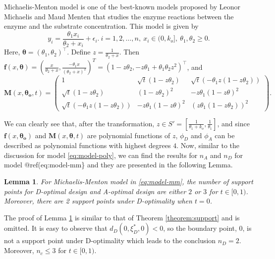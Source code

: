 \documentclass[
]{book}
\newtheorem{lemma}{Lemma}[chapter]
\theoremstyle{definition}
\theoremstyle{definition}
\theoremstyle{definition}
\theoremstyle{definition}
\theoremstyle{remark}
\begin{document}
Michaelis-Menton model is one of the best-known models proposed by Leonor Michaelis and Maud Menten \citep{mm1913kinetik} that studies the enzyme reactions between the enzyme and the substrate concentration. This model is given by
\begin{equation}
y_i=\frac{\theta_1x_i}{\theta_2+x_i}+\epsilon_i.~ i=1,2,\dots,n,~ x_i \in(0,                                                                k_o],~\theta_1,\theta_2\geq 0.
\label{eq:model-mm}
\end{equation}
Here, \(\boldsymbol{\theta}=(\theta_1,\theta_2)^\top\). Define \(z=\frac{1}{\theta_2+x}\). Then \(\boldsymbol{f}(x,\boldsymbol{\theta})=(\frac{x}{\theta_2+x},\frac{-\theta_1x}{(\theta_2+x)^2})^T= (1-z\theta_2, -z\theta_1 +\theta_1 \theta_2z^2)^\top\), and
\begin{equation}
\boldsymbol{M}(x,\boldsymbol{\theta_o},t)=
\begin{pmatrix}
1                       & \sqrt{t} (1-z\theta_2)        &   \sqrt{t}(-\theta_1 z(1-z\theta_2))\\
\sqrt{t} (1-z\theta_2)  &(1-z\theta_2)^2            &   -z\theta_1(1-z\theta)^2\\
\sqrt{t}(-\theta_1 z(1-z\theta_2))&-z\theta_1(1-z\theta)^2&(z\theta_1(1-z\theta_2))^2
\end{pmatrix}.
\end{equation}

We can clearly see that, after the transformation, \(z\in S'=[\frac{1}{\theta_1+k_o},\frac{1}{\theta_1}]\), and since \(\boldsymbol{f}(x,\boldsymbol{\theta_o})\) and \(\boldsymbol{M}(x,\boldsymbol{\theta},t)\) are polynomial functions of \(z\), \(\phi_D\) and \(\phi_A\) can be described as polynomial functions with highest degrees \(4\). Now, similar to the discussion for model \eqref{eq:model-poly}, we can find the results for \(n_A\) and \(n_D\) for model @ref(eq:model-mm\} and they are presented in the following Lemma.

\begin{lemma}
\protect\hypertarget{lem:mm-support}{}\label{lem:mm-support}For Michaelis-Menton model in \eqref{eq:model-mm}, the number of support points for D-optimal design and A-optimal design are either \(2\) or \(3\) for \(t\in[0,1)\). Moreover, there are 2 support points under D-optimality when \(t=0\).
\end{lemma}

The proof of Lemma \ref{lem:mm-support} is similar to that of Theorem \ref{theorem:support} and is omitted. It is easy to observe that \(d_D(0,\xi_D^*,0)<0\), so the boundary point, 0, is not a support point under D-optimality which leads to the conclusion \(n_D=2\). Moreover, \(n_c\le 3\) for \(t\in[0,1)\).
\end{document}
